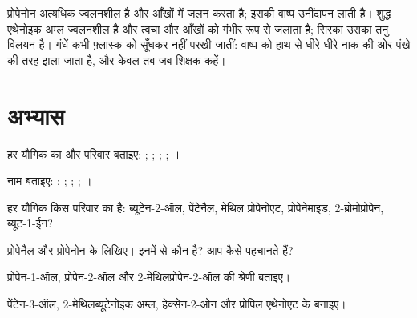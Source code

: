 \begin{safety}{}
प्रोपेनोन अत्यधिक ज्वलनशील है और आँखों में जलन करता है; इसकी वाष्प
उनींदापन लाती है। शुद्ध एथेनोइक अम्ल ज्वलनशील है और त्वचा और आँखों को गंभीर
रूप से जलाता है; सिरका उसका तनु विलयन है।
गंधें कभी फ़्लास्क को सूँघकर नहीं परखी जातीं: वाष्प को हाथ से धीरे-धीरे नाक
की ओर पंखे की तरह झला जाता है, और केवल तब जब शिक्षक
कहें।
\end{safety}

\section{अभ्यास}


\begin{exercise}[$\star$]\label{exo:g11:functional-groups:1}
हर यौगिक का  और परिवार बताइए:
; ; ;
; ।
\end{exercise}

\begin{exercise}[$\star$]\label{exo:g11:functional-groups:2}
नाम बताइए: ; ; ; ;
।
\end{exercise}

\begin{exercise}[$\star$]\label{exo:g11:functional-groups:3}
हर यौगिक किस परिवार का है: ब्यूटेन-2-ऑल, पेंटेनैल, मेथिल
प्रोपेनोएट, प्रोपेनेमाइड, 2-ब्रोमोप्रोपेन, ब्यूट-1-ईन?
\end{exercise}

\begin{exercise}[$\star$]\label{exo:g11:functional-groups:4}
प्रोपेनैल और प्रोपेनोन के  लिखिए। इनमें से कौन
 है? आप कैसे पहचानते हैं?
\end{exercise}

\begin{exercise}[$\star$]\label{exo:g11:functional-groups:5}
प्रोपेन-1-ऑल, प्रोपेन-2-ऑल और 2-मेथिलप्रोपेन-2-ऑल की श्रेणी बताइए।
\end{exercise}

\begin{exercise}[$\star\star$]\label{exo:g11:functional-groups:6}
पेंटेन-3-ऑल, 2-मेथिलब्यूटेनोइक अम्ल, हेक्सेन-2-ओन और प्रोपिल एथेनोएट के
 बनाइए।
\end{exercise}

